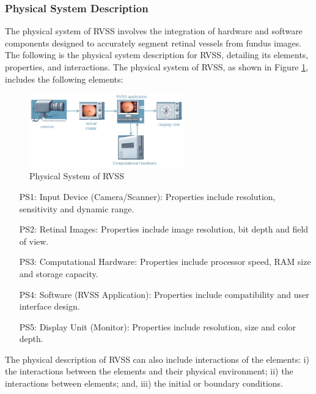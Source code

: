 \documentclass[12pt]{article}
\begin{document}
\subsubsection{Physical System Description} \label{sec_phySystDescrip}

The physical system of RVSS involves the integration of hardware and software components designed to accurately segment retinal vessels from fundus images. The following is the physical system description for RVSS, detailing its elements, properties, and interactions. The physical system of RVSS, as shown in Figure \ref{Fig_PhysicalSystem},
includes the following elements:

\begin{figure}[h!]
\begin{center}
\includegraphics[width=0.60\textwidth]{physical system}
\caption{Physical System of RVSS}
\label{Fig_PhysicalSystem} 
\end{center}
\end{figure}

\begin{itemize}

\item[PS1:] Input Device (Camera/Scanner): Properties include resolution, sensitivity and dynamic range.

\item[PS2:] Retinal Images: Properties include image resolution, bit depth and field of view.

\item[PS3:] Computational Hardware: Properties include processor speed, RAM size and storage capacity.

\item[PS4:] Software (RVSS Application): Properties include compatibility and user interface design.

\item[PS5:] Display Unit (Monitor): Properties include resolution, size and color depth.

\end{itemize}

The physical description of RVSS can also include interactions of the elements: i) the interactions between the elements and their physical environment; ii) the interactions between elements; and, iii) the initial or boundary conditions.
\end{document}
